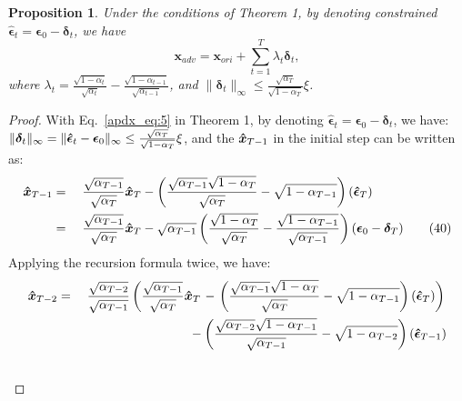 \documentclass{article}
\newtheorem{proof}{Proof}
\newtheorem{proposition}{Proposition}
\begin{document}
\setcounter{proposition}{0}
\begin{proposition}
\label{prop1}
Under the conditions of Theorem 1, by denoting constrained $\boldsymbol{\hat{\epsilon}}_t = \boldsymbol{\epsilon}_0 - \boldsymbol{\delta}_t$, we have
    \begin{equation}\tag{39}
    \boldsymbol{x}_{adv}=\boldsymbol{x}_{ori}+\sum_{t=1}^{T}\lambda_{t}\boldsymbol{\delta}_t,
    \label{apdx_eq:25}
    \end{equation}
    where $\lambda_{t} = \frac{\sqrt{1-\alpha_t}}{\sqrt{\alpha_t}} - \frac{\sqrt{1-{\alpha_{t-1}}}}{\sqrt{\alpha_{t-1}}}$, and $\|\boldsymbol{\delta}_t\|_{\infty} \leq \frac{\sqrt{\alpha_T}}{\sqrt{1-\alpha_T}}\xi$.
\end{proposition}
\begin{proof}
 With Eq.~\eqref{apdx_eq:5} in Theorem 1, by denoting $\boldsymbol{\hat{\epsilon}}_t = \boldsymbol{\epsilon}_0 - \boldsymbol{\delta}_t$, we have: $\|\boldsymbol{\delta}_t\|_{\infty} = \|\boldsymbol{\Hat{\epsilon}}_{t} - \boldsymbol{\epsilon}_{0}\|_{\infty} \leq \frac{\sqrt{\alpha_T}}{\sqrt{1-\alpha_T}}\xi$, and the $\boldsymbol{\Hat{x}}_{T-1}$ in the initial step can be written as:
\begin{alignat}{2}
\boldsymbol{\Hat{x}}_{T-1} \notag & = \; && \frac{\sqrt{\alpha_{T-1}}}{\sqrt{\alpha_{T}}} \boldsymbol{\Hat{x}}_{T}\notag  - {\left(\frac{\sqrt{\alpha_{T-1}}\sqrt{1-\alpha_{T}}}{\sqrt{\alpha_{T}}} - \sqrt{1-\alpha_{T-1}}\right) \left( \boldsymbol{\Hat{\epsilon}}_T \right)} \notag \\
& = \; && \frac{\sqrt{\alpha_{T-1}}}{\sqrt{\alpha_{T}}} \boldsymbol{\Hat{x}}_{T} \notag  - {\sqrt{\alpha_{T-1}} \left(\frac{\sqrt{1-\alpha_{T}}}{\sqrt{\alpha_{T}}} - \frac{\sqrt{1-\alpha_{T-1}}}{\sqrt{\alpha_{T-1}}}\right) \left( \boldsymbol{\epsilon}_0 - \boldsymbol{\delta}_T \right)} \tag{40} \label{apdx_eq:26}
\end{alignat}
Applying the recursion formula twice, we have:
\begin{alignat}{2}
\boldsymbol{\Hat{x}}_{T-2} \notag  & = \; && \frac{\sqrt{\alpha_{T-2}}}{\sqrt{\alpha_{T-1}}} \left(\frac{\sqrt{\alpha_{T-1}}}{\sqrt{\alpha_{T}}} \boldsymbol{\Hat{x}}_{T} \right. \notag - {\left. \left(\frac{\sqrt{\alpha_{T-1}}\sqrt{1-\alpha_{T}}}{\sqrt{\alpha_{T}}} - \sqrt{1-\alpha_{T-1}}\right) \left( \boldsymbol{\Hat{\epsilon}}_T \right)\right)} \notag \\
& && \quad \quad \quad \quad \quad \quad  \quad \quad- {\left(\frac{\sqrt{\alpha_{T-2}}\sqrt{1-\alpha_{T-1}}}{\sqrt{\alpha_{T-1}}} - \sqrt{1-\alpha_{T-2}}\right) \left( \boldsymbol{\Hat{\epsilon}}_{T-1} \right)} \notag \\ \notag \\

\end{alignat}
\end{proof}
\end{document}
